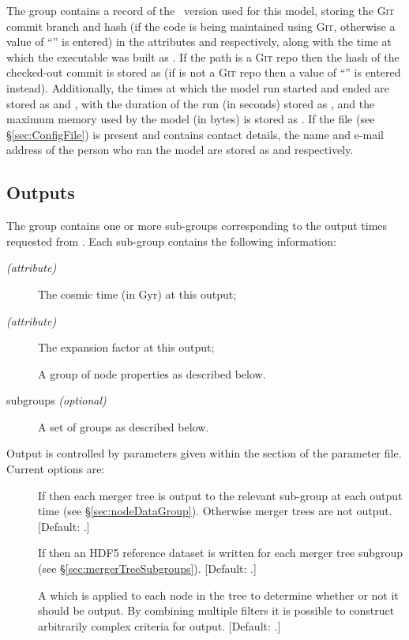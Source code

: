 The  group contains a record of the \glc\ version used for this model, storing the {\normalfont \scshape Git} commit branch and hash (if the code is being maintained using {\normalfont \scshape Git}, otherwise a value of ``'' is entered) in the attributes  and  respectively, along with the time at which the executable was built as . If the  path is a {\normalfont \scshape Git} repo then the hash of the checked-out commit is stored as  (if  is not a {\normalfont \scshape Git} repo then a value of ``'' is entered instead). Additionally, the times at which the model run started and ended are stored as  and , with the duration of the run (in seconds) stored as , and the maximum memory used by the model (in bytes) is stored as . If the  file (see \S\ref{sec:ConfigFile}) is present and contains contact details, the name and e-mail address of the person who ran the model are stored as  and  respectively.

\subsection{Outputs}

The  group contains one or more sub-groups corresponding to the output times requested from \glc. Each sub-group contains the following information:
\begin{description}
 \item[ \emph{(attribute)}] The cosmic time (in Gyr) at this output;
 \item[ \emph{(attribute)}] The expansion factor at this output;
 \item[] A group of node properties as described below.
 \item[ subgroups \emph{(optional)}] A set of  groups as described below.
\end{description}

Output is controlled by parameters given within the  section of the parameter file. Current options are:
\begin{description}
\item[] If  then each merger tree is output to the relevant sub-group at each output time (see \S\ref{sec:nodeDataGroup}). Otherwise merger trees are not output. [Default: .]
\item[] If  then an HDF5 reference dataset is written for each merger tree subgroup (see \S\ref{sec:mergerTreeSubgroups}). [Default: .]
\item[] A  which is applied to each node in the tree to determine whether or not it should be output. By combining multiple filters it is possible to construct arbitrarily complex criteria for output. [Default: .]
\end{description}

